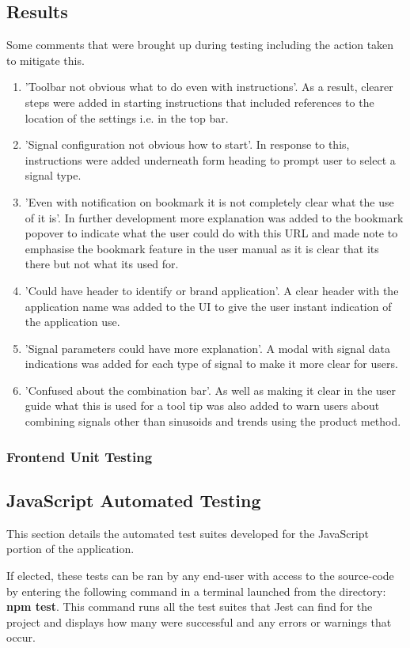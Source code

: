 \subsection{Results}
Some comments that were brought up during testing including the action taken to mitigate this.
\begin{enumerate}
\item 'Toolbar not obvious what to do even with instructions'. As a result, clearer steps were added in starting instructions that included references to the location of the settings i.e. in the top bar.
\item 'Signal configuration not obvious how to start'. In response to this, instructions were added underneath form heading to prompt user to select a signal type.
\item 'Even with notification on bookmark it is not completely clear what the use of it is'. In further development more explanation was added to the bookmark popover to indicate what the user could do with this URL and made note to emphasise the bookmark feature in the user manual as it is clear that its there but not what its used for.
\item 'Could have header to identify or brand application'. A clear header with the application name was added to the UI to give the user instant indication of the application use.
\item 'Signal parameters could have more explanation'. A modal with signal data indications was added for each type of signal to make it more clear for users. 
\item 'Confused about the combination bar'. As well as making it clear in the user guide what this is used for a tool tip was also added to warn users about combining signals other than sinusoids and trends using the product method. 
\end{enumerate}
\subsubsection{Frontend Unit Testing}

\subsection{JavaScript Automated Testing}
This section details the automated test suites developed for the JavaScript portion of the application. 

If elected, these tests can be ran by any end-user with access to the source-code by entering the following command in a terminal launched from the directory: {\bf npm test}. This command runs all the test suites that Jest can find for the project and displays how many were successful and any errors or warnings that occur. 

